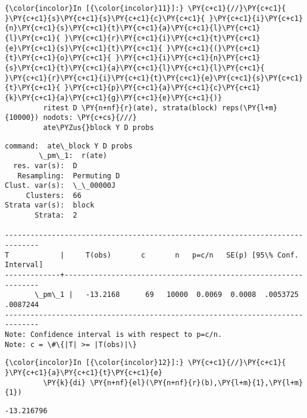 \documentclass[11pt,notitlepage]{article}\usepackage[]{graphicx}\usepackage[]{color}
\makeatletter
\newenvironment{kframe}{%
 \def\at@end@of@kframe{}%
 \ifinner\ifhmode%
  \def\at@end@of@kframe{\end{minipage}}%
  \begin{minipage}{\columnwidth}%
 \fi\fi%
 \def\FrameCommand##1{\hskip\@totalleftmargin \hskip-\fboxsep
 \colorbox{shadecolor}{##1}\hskip-\fboxsep
     \hskip-\linewidth \hskip-\@totalleftmargin \hskip\columnwidth}%
 \MakeFramed {\advance\hsize-\width
   \@totalleftmargin\z@ \linewidth\hsize
   \@setminipage}}%
 {\par\unskip\endMakeFramed%
 \at@end@of@kframe}
\newenvironment{knitrout}{}{} %
\makeatother
\begin{document}
\begin{enumerate}[a)]
\begin{knitrout}
\begin{kframe}
    \begin{Verbatim}[commandchars=\\\{\}]
{\color{incolor}In [{\color{incolor}11}]:} \PY{c+c1}{//}\PY{c+c1}{ }\PY{c+c1}{s}\PY{c+c1}{s}\PY{c+c1}{c}\PY{c+c1}{ }\PY{c+c1}{i}\PY{c+c1}{n}\PY{c+c1}{s}\PY{c+c1}{t}\PY{c+c1}{a}\PY{c+c1}{l}\PY{c+c1}{l}\PY{c+c1}{ }\PY{c+c1}{r}\PY{c+c1}{i}\PY{c+c1}{t}\PY{c+c1}{e}\PY{c+c1}{s}\PY{c+c1}{t}\PY{c+c1}{ }\PY{c+c1}{(}\PY{c+c1}{t}\PY{c+c1}{o}\PY{c+c1}{ }\PY{c+c1}{i}\PY{c+c1}{n}\PY{c+c1}{s}\PY{c+c1}{t}\PY{c+c1}{a}\PY{c+c1}{l}\PY{c+c1}{l}\PY{c+c1}{ }\PY{c+c1}{r}\PY{c+c1}{i}\PY{c+c1}{t}\PY{c+c1}{e}\PY{c+c1}{s}\PY{c+c1}{t}\PY{c+c1}{ }\PY{c+c1}{p}\PY{c+c1}{a}\PY{c+c1}{c}\PY{c+c1}{k}\PY{c+c1}{a}\PY{c+c1}{g}\PY{c+c1}{e}\PY{c+c1}{)}
         ritest D \PY{n+nf}{r}(ate), strata(block) reps(\PY{l+m}{10000}) nodots: \PY{c+cs}{///}
         ate\PYZus{}block Y D probs
\end{Verbatim}

    \begin{Verbatim}[commandchars=\\\{\}]
      command:  ate\_block Y D probs
        \_pm\_1:  r(ate)
  res. var(s):  D
   Resampling:  Permuting D
Clust. var(s):  \_\_00000J
     Clusters:  66
Strata var(s):  block
       Strata:  2

------------------------------------------------------------------------------
T            |     T(obs)       c       n   p=c/n   SE(p) [95\% Conf. Interval]
-------------+----------------------------------------------------------------
       \_pm\_1 |   -13.2168      69   10000  0.0069  0.0008  .0053725   .0087244
------------------------------------------------------------------------------
Note: Confidence interval is with respect to p=c/n.
Note: c = \#\{|T| >= |T(obs)|\}

    \end{Verbatim}

    \begin{Verbatim}[commandchars=\\\{\}]
{\color{incolor}In [{\color{incolor}12}]:} \PY{c+c1}{//}\PY{c+c1}{ }\PY{c+c1}{a}\PY{c+c1}{t}\PY{c+c1}{e}
         \PY{k}{di} \PY{n+nf}{el}(\PY{n+nf}{r}(b),\PY{l+m}{1},\PY{l+m}{1})
\end{Verbatim}

    \begin{Verbatim}[commandchars=\\\{\}]
-13.216796

    \end{Verbatim}


\end{kframe}
\end{knitrout}
\end{enumerate}
\end{document}
